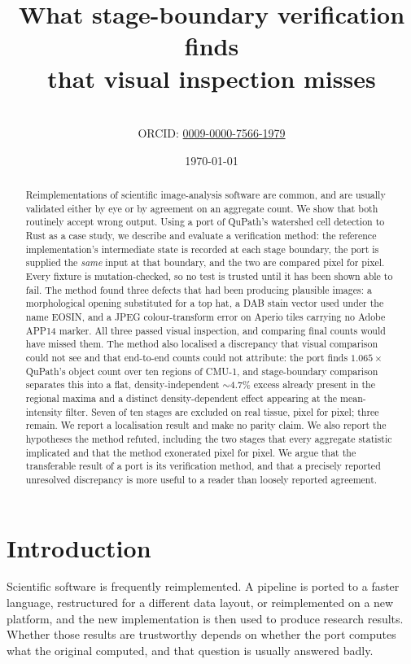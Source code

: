 \documentclass[11pt,a4paper]{article}
\title{What stage-boundary verification finds\\
       that visual inspection misses}
\author{\todo{author, affiliation}\\\small ORCID: \href{https://orcid.org/0009-0000-7566-1979}{0009-0000-7566-1979}}
\date{\today}
\begin{document}
\maketitle

\begin{abstract}
Reimplementations of scientific image-analysis software are common, and are
usually validated either by eye or by agreement on an aggregate count. We show
that both routinely accept wrong output. Using a port of QuPath's watershed
cell detection to Rust as a case study, we describe and evaluate a verification
method: the reference implementation's intermediate state is recorded at each
stage boundary, the port is supplied the \emph{same} input at that boundary,
and the two are compared pixel for pixel. Every fixture is mutation-checked, so
no test is trusted until it has been shown able to fail. The method found three
defects that had been producing plausible images: a morphological opening
substituted for a top hat, a DAB stain vector used under the name EOSIN, and a
JPEG colour-transform error on Aperio tiles carrying no Adobe APP14 marker. All
three passed visual inspection, and comparing final counts would have missed
them. The method also localised a discrepancy that visual comparison could not
see and that end-to-end counts could not attribute: the port finds
$1.065\times$ QuPath's object count over ten regions of CMU-1, and
stage-boundary comparison separates this into a flat, density-independent
$\sim$4.7\% excess already present in the regional maxima and a distinct
density-dependent effect appearing at the mean-intensity filter. Seven of ten
stages are excluded on real tissue, pixel for pixel; three remain. We report a
localisation result and make no parity claim. We also report the hypotheses the
method refuted, including the two stages that every aggregate statistic
implicated and that the method exonerated pixel for pixel. We argue that the
transferable result of a port is its verification method, and that a precisely
reported unresolved discrepancy is more useful to a reader than loosely
reported agreement.
\end{abstract}

\section{Introduction}
\label{sec:intro}

Scientific software is frequently reimplemented. A pipeline is ported to a
faster language, restructured for a different data layout, or reimplemented on
a new platform, and the new implementation is then used to produce research
results. Whether those results are trustworthy depends on whether the port
computes what the original computed, and that question is usually answered
badly.
\end{document}
